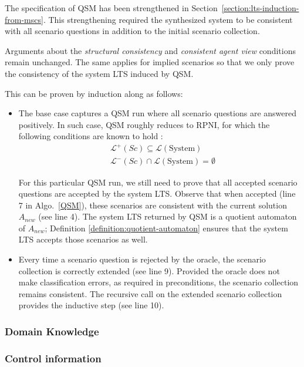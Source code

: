 The specification of QSM has been strengthened in Section~\ref{section:lts-induction-from-mscs}. This strengthening required the synthesized system to be consistent with all scenario questions in addition to the initial scenario collection. 

Arguments about the \emph{structural consistency} and \emph{consistent agent view} conditions remain unchanged. The same applies for implied scenarios so that we only prove the consistency of the system LTS induced by QSM.

This can be proven by induction along as follows:
\begin{itemize}
\item The base case captures a QSM run where all scenario questions are answered positively. In such case, QSM roughly reduces to RPNI, for which the following conditions are known to hold \cite{Oncina:1993}:
\begin{align}
&\mathcal{L}^+(Sc) \subseteq \mathcal{L}(\mbox{System})\\
&\mathcal{L}^-(Sc) \cap \mathcal{L}(\mbox{System}) = \emptyset
\end{align}

For this particular QSM run, we still need to prove that all accepted scenario questions are accepted by the system LTS. Observe that when accepted (line 7 in Algo.~\ref{QSM}), these scenarios are consistent with the current solution $A_{new}$ (see line 4). The system LTS returned by QSM is a quotient automaton of $A_{new}$; Definition \ref{definition:quotient-automaton} ensures that the system LTS accepts those scenarios as well.
\item Every time a scenario question is rejected by the oracle, the scenario collection is correctly extended (see line 9). Provided the oracle does not make classification errors, as required in preconditions, the scenario collection remains consistent. The recursive call on the extended scenario collection provides the inductive step (see line 10).
\end{itemize}

\subsubsection*{Domain Knowledge}

\subsubsection*{Control information}

